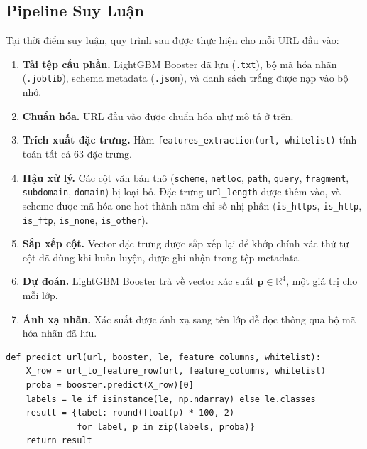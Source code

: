 \documentclass[a4paper,12pt]{article}
\begin{document}
\subsection{Pipeline Suy Luận}

Tại thời điểm suy luận, quy trình sau được thực hiện cho mỗi URL đầu vào:

\begin{enumerate}
    \item \textbf{Tải tệp cấu phần.} LightGBM Booster đã lưu (\texttt{.txt}), bộ mã hóa nhãn (\texttt{.joblib}), schema metadata (\texttt{.json}), và danh sách trắng được nạp vào bộ nhớ.
    \item \textbf{Chuẩn hóa.} URL đầu vào được chuẩn hóa như mô tả ở trên.
    \item \textbf{Trích xuất đặc trưng.} Hàm \texttt{features\_extraction(url, whitelist)} tính toán tất cả 63 đặc trưng.
    \item \textbf{Hậu xử lý.} Các cột văn bản thô (\texttt{scheme}, \texttt{netloc}, \texttt{path}, \texttt{query}, \texttt{fragment}, \texttt{subdomain}, \texttt{domain}) bị loại bỏ. Đặc trưng \texttt{url\_length} được thêm vào, và scheme được mã hóa one-hot thành năm chỉ số nhị phân (\texttt{is\_https}, \texttt{is\_http}, \texttt{is\_ftp}, \texttt{is\_none}, \texttt{is\_other}).
    \item \textbf{Sắp xếp cột.} Vector đặc trưng được sắp xếp lại để khớp chính xác thứ tự cột đã dùng khi huấn luyện, được ghi nhận trong tệp metadata.
    \item \textbf{Dự đoán.} LightGBM Booster trả về vector xác suất $\mathbf{p} \in \mathbb{R}^4$, một giá trị cho mỗi lớp.
    \item \textbf{Ánh xạ nhãn.} Xác suất được ánh xạ sang tên lớp dễ đọc thông qua bộ mã hóa nhãn đã lưu.
\end{enumerate}

\begin{lstlisting}[caption={Logic suy luận chính}]
def predict_url(url, booster, le, feature_columns, whitelist):
    X_row = url_to_feature_row(url, feature_columns, whitelist)
    proba = booster.predict(X_row)[0]
    labels = le if isinstance(le, np.ndarray) else le.classes_
    result = {label: round(float(p) * 100, 2)
              for label, p in zip(labels, proba)}
    return result
\end{lstlisting}

\end{document}
